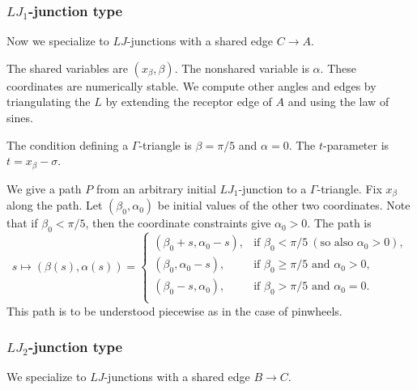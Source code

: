 
\subsubsection{$LJ_1$-junction type}

Now we specialize to $LJ$-junctions with a shared edge $C\to A$.

The shared variables are $(x_\beta,\beta)$.  The nonshared variable is
$\alpha$.  These coordinates are numerically stable.  We compute other
angles and edges by triangulating the $L$ by extending the receptor
edge of $A$ and using the law of sines.

The condition defining a $\Gamma$-triangle is $\beta=\pi/5$ and
$\alpha=0$.  The $t$-parameter is $t =x_\beta - \sigma$.

We give a path $P$ from an arbitrary initial $LJ_1$-junction to a
$\Gamma$-triangle.  Fix $x_\beta$ along the path.  Let
$(\beta_0,\alpha_0)$ be initial values of the other two coordinates.
Note that if $\beta_0<\pi/5$, then the coordinate constraints give
$\alpha_0>0$.  The path is
\[
s\mapsto (\beta(s),\alpha(s)) = 
\begin{cases}
(\beta_0+s,\alpha_0-s),&\text{if } \beta_0 < \pi/5 ~(\text{so also } \alpha_0>0),\\
(\beta_0,\alpha_0-s),&\text{if } \beta_0 \ge \pi/5 \text{ and } \alpha_0 > 0,\\
(\beta_0-s,\alpha_0),&\text{if } \beta_0 > \pi/5 \text{ and } \alpha_0 = 0.\\
\end{cases}
\]
This path is to be understood piecewise as in the case of pinwheels. 

\subsubsection{$LJ_2$-junction type}

We specialize to $LJ$-junctions with a shared edge $B\to C$.  

